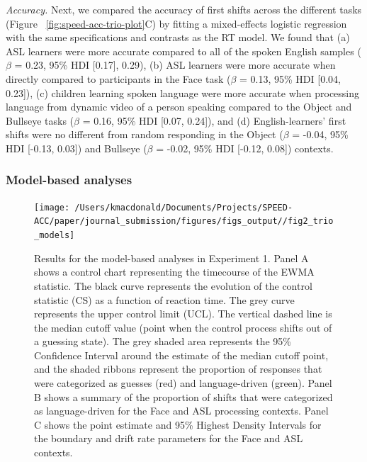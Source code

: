 \documentclass[english,floatsintext,man]{apa6}
\begin{document}
\emph{Accuracy.} Next, we compared the accuracy of first shifts across
the different tasks (Figure ~\ref{fig:speed-acc-trio-plot}C) by fitting
a mixed-effects logistic regression with the same specifications and
contrasts as the RT model. We found that (a) ASL learners were more
accurate compared to all of the spoken English samples (\(\beta\) =
0.23, 95\% HDI {[}0.17{]}, 0.29), (b) ASL learners were more accurate
when directly compared to participants in the Face task (\(\beta\) =
0.13, 95\% HDI {[}0.04, 0.23{]}), (c) children learning spoken language
were more accurate when processing language from dynamic video of a
person speaking compared to the Object and Bullseye tasks (\(\beta\) =
0.16, 95\% HDI {[}0.07, 0.24{]}), and (d) English-learners' first shifts
were no different from random responding in the Object (\(\beta\) =
-0.04, 95\% HDI {[}-0.13, 0.03{]}) and Bullseye (\(\beta\) = -0.02, 95\%
HDI {[}-0.12, 0.08{]}) contexts.

\hypertarget{model-based-analyses}{%
\subsubsection{Model-based analyses}\label{model-based-analyses}}

\begin{figure}[!t]

{\centering \texttt{[image: /Users/kmacdonald/Documents/Projects/SPEED-ACC/paper/journal\_submission/figures/figs\_output//fig2\_trio\_models]} 

}

\caption{Results for the model-based analyses in Experiment 1. Panel A shows a control chart representing the timecourse of the EWMA statistic. The black curve represents the evolution of the control statistic (CS) as a function of reaction time. The grey curve represents the upper control limit (UCL). The vertical dashed line is the median cutoff value (point when the control process shifts out of a guessing state). The grey shaded area represents the 95\% Confidence Interval around the estimate of the median cutoff point, and the shaded ribbons represent the proportion of responses that were categorized as guesses (red) and language-driven (green). Panel B shows a summary of the proportion of shifts that were categorized as language-driven for the Face and ASL processing contexts. Panel C shows the point estimate and 95\% Highest Density Intervals for the boundary and drift rate parameters for the Face and ASL contexts.}\label{fig:trio-model-plot}
\end{figure}
\end{document}
